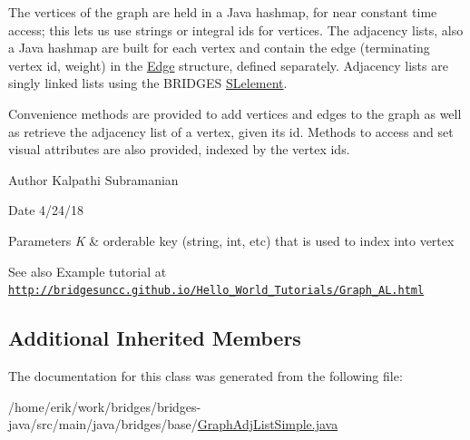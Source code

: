 The vertices of the graph are held in a Java hashmap, for near constant time access; this lets us use strings or integral ids for vertices. The adjacency lists, also a Java hashmap are built for each vertex and contain the edge (terminating vertex id, weight) in the \hyperlink{classbridges_1_1base_1_1_edge}{Edge} structure, defined separately. Adjacency lists are singly linked lists using the B\+R\+I\+D\+G\+ES \hyperlink{classbridges_1_1base_1_1_s_lelement}{S\+Lelement}.

Convenience methods are provided to add vertices and edges to the graph as well as retrieve the adjacency list of a vertex, given its id. Methods to access and set visual attributes are also provided, indexed by the vertex ids.

\begin{DoxyAuthor}{Author}
Kalpathi Subramanian
\end{DoxyAuthor}
\begin{DoxyDate}{Date}
4/24/18
\end{DoxyDate}

\begin{DoxyParams}{Parameters}
{\em K} & orderable key (string, int, etc) that is used to index into vertex\\
\hline
\end{DoxyParams}
\begin{DoxySeeAlso}{See also}
Example tutorial at \href{http://bridgesuncc.github.io/Hello_World_Tutorials/Graph_AL.html}{\tt http\+://bridgesuncc.\+github.\+io/\+Hello\+\_\+\+World\+\_\+\+Tutorials/\+Graph\+\_\+\+A\+L.\+html} 
\end{DoxySeeAlso}
\subsection*{Additional Inherited Members}


The documentation for this class was generated from the following file\+:\begin{DoxyCompactItemize}
\item 
/home/erik/work/bridges/bridges-\/java/src/main/java/bridges/base/\hyperlink{_graph_adj_list_simple_8java}{Graph\+Adj\+List\+Simple.\+java}\end{DoxyCompactItemize}
